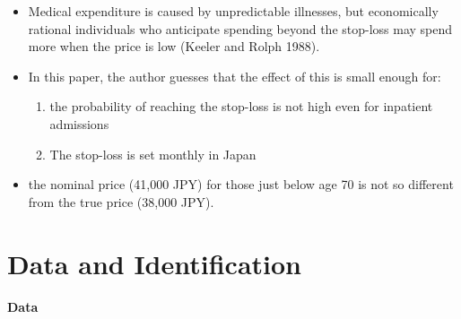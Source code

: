 \documentclass[../root]{subfiles}
\begin{document}
    \begin{itemize}
      \item Medical expenditure is caused by unpredictable illnesses, but  economically rational individuals who anticipate spending beyond the stop-loss may spend more when the price is low (Keeler and Rolph 1988).
      \item In this paper, the author guesses that the effect of this is small enough for:
      \begin{enumerate}
        \item the probability of reaching the stop-loss is not high even for inpatient admissions
        \item The stop-loss is set monthly in Japan
      \end{enumerate}
      \item the nominal price (41,000 JPY) for those just below age 70 is not so different from the true price (38,000 JPY).
    \end{itemize}

    \section{Data and Identification}

    \paragraph{Data}
\end{document}
